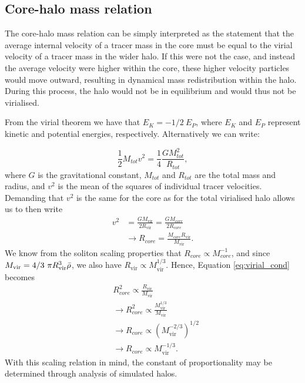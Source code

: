 \documentclass[a4paper,11pt]{article}
\begin{document}
\begin{appendices}
\section{Core-halo mass relation}\label{app:core-halo}

The core-halo mass relation can be simply interpreted as the statement that the average internal velocity of a tracer mass in the core must be equal to the virial velocity of a tracer mass in the wider halo. If this were not the case, and instead the average velocity were higher within the core, these higher velocity particles would move outward, resulting in dynamical mass redistribution within the halo. During this process, the halo would not be in equilibrium and would thus not be virialised.

From the virial theorem we have that $E_K=-1/2 \ E_P$, where $E_K$ and $E_P$ represent kinetic and potential energies, respectively. Alternatively we can write:

\begin{equation}
    \frac{1}{2}M_{tot}v^2=\frac{1}{4}\frac{GM_{tot}^2}{R_{tot}},
\end{equation}
where $G$ is the gravitational constant, $M_{tot}$ and $R_{tot}$ are the total mass and radius, and $v^2$ is the mean of the squares of individual tracer velocities. Demanding that $v^2$ is the same for the core as for the total virialised halo allows us to then write
\begin{align}\label{eq:virial_cond}
    v^2&=\frac{GM_{\mathrm{vir}}}{2 R_{\mathrm{vir}}}=\frac{G M_{core}}{2 R_{core}}\nonumber\\
    &\rightarrow R_{core}=\frac{M_{core} R_{\mathrm{vir}}}{M_{\mathrm{vir}}}.
\end{align}
We know from the soliton scaling properties that $R_{core}\propto M_{core}^{-1}$, and since $M_{\mathrm{vir}}=4/3 \ \pi R_{\mathrm{vir}}^3 \Bar{\rho}$, we also have $R_{\mathrm{vir}} \propto M_{\mathrm{vir}}^{1/3}$. Hence, Equation \ref{eq:virial_cond} becomes
\begin{align}
    &R_{core}^2\propto \frac{R_{\mathrm{vir}}}{M_{\mathrm{vir}}}\nonumber\\
    &\rightarrow R_{core}^2\propto \frac{M_{\mathrm{vir}}^{1/3}}{M_{\mathrm{vir}}}\nonumber\\
    &\rightarrow R_{core}\propto\left(M_{\mathrm{vir}}^{-2/3}\right)^{1/2}\nonumber\\
    &\rightarrow R_{core}\propto M_{\mathrm{vir}}^{-1/3}.
\end{align}
With this scaling relation in mind, the constant of proportionality may be determined through analysis of simulated halos. 





\end{appendices}
\end{document}
